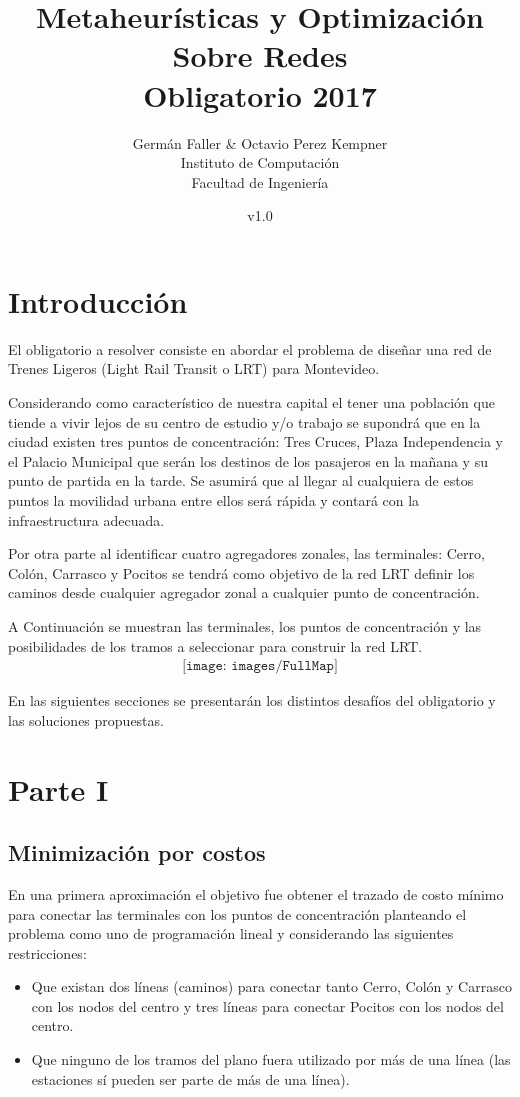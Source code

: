 \documentclass[a4paper,11pt]{article}
\title{Metaheurísticas y Optimización Sobre Redes \\ Obligatorio 2017}
\author{Germán Faller  \& Octavio Perez Kempner\\ Instituto de Computación\\ Facultad de Ingeniería}
\date{v1.0}
\theoremstyle{break}
\begin{document}
\maketitle

\tableofcontents

\newpage

\section{Introducción}

El obligatorio a resolver consiste en abordar el problema de diseñar una red de Trenes Ligeros (Light Rail Transit o LRT) para Montevideo.

Considerando como característico de nuestra capital el tener una población que tiende a vivir lejos de su centro de estudio y/o trabajo se supondrá que en la ciudad existen tres puntos de concentración: Tres Cruces, Plaza Independencia y el Palacio Municipal que serán los destinos de los pasajeros en la mañana y su punto de partida en la tarde. Se asumirá que al llegar al cualquiera de estos puntos la movilidad urbana entre ellos será rápida y contará con la infraestructura adecuada.

Por otra parte al identificar cuatro agregadores zonales, las terminales: Cerro, Colón, Carrasco y Pocitos se tendrá como objetivo de la red LRT definir los caminos desde cualquier agregador zonal a cualquier punto de concentración.

A Continuación se muestran las terminales, los puntos de concentración y las posibilidades de los tramos a seleccionar para construir la red LRT.
\begin{align*}
	\texttt{[image: images/FullMap]}
\end{align*}

En las siguientes secciones se presentarán los distintos desafíos del obligatorio y las soluciones propuestas.

\section{Parte I}
\subsection{Minimización por costos}
En una primera aproximación el objetivo fue obtener el trazado de costo mínimo para conectar las terminales con los puntos de concentración planteando el problema como uno de programación lineal y considerando las siguientes restricciones:
\begin{itemize}
	\item Que existan dos líneas (caminos) para conectar tanto Cerro, Colón y Carrasco con los nodos del centro y tres líneas para conectar Pocitos con los nodos del centro.
	\item Que ninguno de los tramos del plano fuera utilizado por más de una línea (las estaciones sí pueden ser parte de más de una línea).
\end{itemize}
\end{document}
